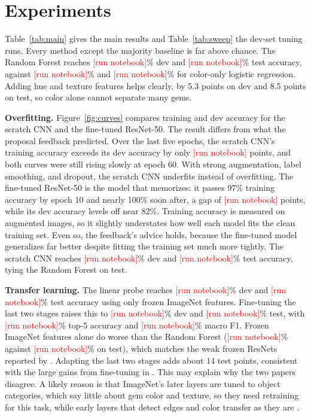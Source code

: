 \documentclass{article}
\newcommand{\fillin}[1]{\textcolor{red}{[#1]}}
\newcommand{\pending}{\fillin{run notebook}}
\providecommand{\LRDev}{\pending}\providecommand{\LRTest}{\pending}\providecommand{\LRC}{\pending}
\providecommand{\RFDev}{\pending}\providecommand{\RFTest}{\pending}\providecommand{\RFTopFiveTest}{\pending}
\providecommand{\CNNDev}{\pending}\providecommand{\CNNTest}{\pending}
\providecommand{\CNNEpochs}{60}\providecommand{\CNNBestEpoch}{\pending}
\providecommand{\CNNGap}{\pending}\providecommand{\FTGap}{\pending}\providecommand{\TrainMean}{\pending}
\providecommand{\LinDev}{\pending}\providecommand{\LinTest}{\pending}
\providecommand{\FTDev}{\pending}\providecommand{\FTTest}{\pending}
\providecommand{\FTTopFiveTest}{\pending}\providecommand{\FTFOneTest}{\pending}
\newcommand{\resultinput}[1]{\IfFileExists{\ResultsDir/#1}{}{\fbox{\pending}}}
\begin{document}
\begin{table}[t]
\caption{Dev-set tuning runs (\%). For each method, the setting with the highest top-1 is used in Table~\ref{tab:main}.}
\label{tab:sweep}
\vskip 0.1in
\begin{center}
\begin{scriptsize}
\resultinput{table_sweep.tex}
\end{scriptsize}
\end{center}
\vskip -0.1in
\end{table}

\section{Experiments}

Table~\ref{tab:main} gives the main results and Table~\ref{tab:sweep} the dev-set tuning runs. Every method except the majority baseline is far above chance. The Random Forest reaches \RFDev\% dev and \RFTest\% test accuracy, against \LRDev\% and \LRTest\% for color-only logistic regression. Adding hue and texture features helps clearly, by 5.3 points on dev and 8.5 points on test, so color alone cannot separate many gems.

\textbf{Overfitting.} Figure~\ref{fig:curves} compares training and dev accuracy for the scratch CNN and the fine-tuned ResNet-50. The result differs from what the proposal feedback predicted. Over the last five epochs, the scratch CNN's training accuracy exceeds its dev accuracy by only \CNNGap{} points, and both curves were still rising slowly at epoch \CNNEpochs{}. With strong augmentation, label smoothing, and dropout, the scratch CNN underfits instead of overfitting. The fine-tuned ResNet-50 is the model that memorizes: it passes 97\% training accuracy by epoch 10 and nearly 100\% soon after, a gap of \FTGap{} points, while its dev accuracy levels off near 82\%. Training accuracy is measured on augmented images, so it slightly understates how well each model fits the clean training set. Even so, the feedback's advice holds, because the fine-tuned model generalizes far better despite fitting the training set much more tightly. The scratch CNN reaches \CNNDev\% dev and \CNNTest\% test accuracy, tying the Random Forest on test.

\textbf{Transfer learning.} The linear probe reaches \LinDev\% dev and \LinTest\% test accuracy using only frozen ImageNet features. Fine-tuning the last two stages raises this to \FTDev\% dev and \FTTest\% test, with \FTTopFiveTest\% top-5 accuracy and \FTFOneTest\% macro F1. Frozen ImageNet features alone do worse than the Random Forest (\LinTest\% against \RFTest\% on test), which matches the weak frozen ResNets reported by \citet{chow2022gemstone}. Adapting the last two stages adds about 14 test points, consistent with the large gains from fine-tuning in \citet{freire2022gemstone}. This may explain why the two papers disagree. A likely reason is that ImageNet's later layers are tuned to object categories, which say little about gem color and texture, so they need retraining for this task, while early layers that detect edges and color transfer as they are \citep{yosinski2014transferable}.
\end{document}
